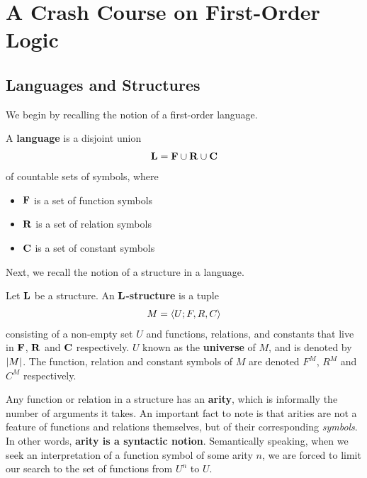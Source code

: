 \section{A Crash Course on First-Order Logic}

\subsection{Languages and Structures}

We begin by recalling the notion of a first-order language.

\begin{boxdefinition}[Language]
    A \textbf{language} is a disjoint union
    \begin{align*}
        \mathbf{L} = \mathbf{F} \cup \mathbf{R} \cup \mathbf{C}
    \end{align*}
    of countable sets of symbols, where
    \begin{itemize}
        \item $\mathbf{F}$ is a set of function symbols
        \item $\mathbf{R}$ is a set of relation symbols
        \item $\mathbf{C}$ is a set of constant symbols
    \end{itemize}
\end{boxdefinition}

Next, we recall the notion of a structure in a language.

\begin{boxdefinition}[Structure]
    Let $\mathbf{L}$ be a structure. An \textbf{$\mathbf{L}$-structure} is a tuple
    \begin{align*}
        M = \left\langle U; F, R, C \right\rangle
    \end{align*}
    consisting of a non-empty set $U$ and functions, relations, and constants that live in $\mathbf{F}$, $\mathbf{R}$ and $\mathbf{C}$ respectively. $U$ known as the \textbf{universe} of $M$, and is denoted by $\left\lvert M \right\rvert$. The function, relation and constant symbols of $M$ are denoted $F^M$, $R^M$ and $C^M$ respectively.
\end{boxdefinition}

Any function or relation in a structure has an \textbf{arity}, which is informally the number of arguments it takes. An important fact to note is that arities are not a feature of functions and relations themselves, but of their corresponding \textit{symbols}. In other words, \textbf{arity is a syntactic notion}. Semantically speaking, when we seek an interpretation of a function symbol of some arity $n$, we are forced to limit our search to the set of functions from $U^n$ to $U$.

